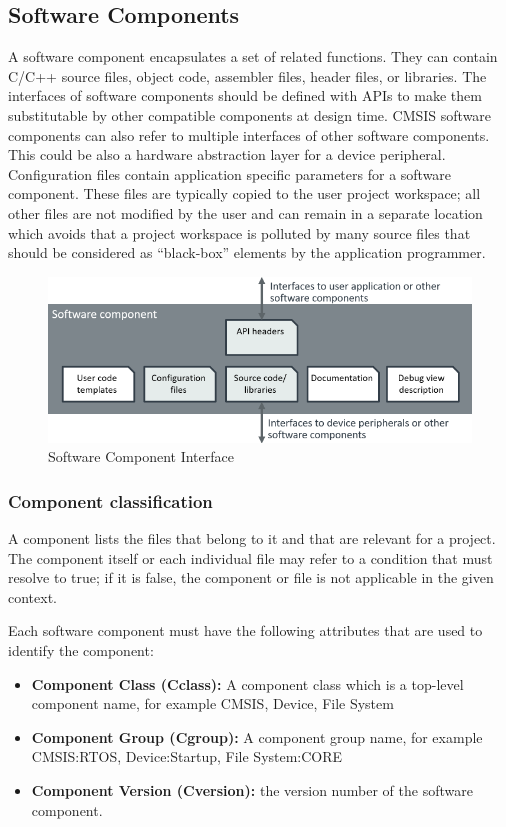 \subsection{Software Components}
A software component encapsulates a set of related functions. They can contain C/C++ source files, object code, assembler files, header files, or libraries. The interfaces of software components should be defined with APIs to make them substitutable by other compatible components at design time.
CMSIS software components can also refer to multiple interfaces of other software components. This could be also a hardware abstraction layer for a device peripheral.
Configuration files contain application specific parameters for a software component. These files are typically copied to the user project workspace; all other files are not modified by the user and can remain in a separate location which avoids that a project workspace is polluted by many source files that should be considered as “black-box” elements by the application programmer.
\begin{figure}[H]
	\centering
	\includegraphics[width=15cm]{img/ST_Summer_Internship/software_component.png}
	\caption{Software Component Interface}
	\label{fig:sw_comp}
\end{figure}
\subsubsection{Component classification}
A component lists the files that belong to it and that are relevant for a project. The component itself or each individual file may refer to a condition that must resolve to true; if it is false, the component or file is not applicable in the given context.

Each software component must have the following attributes that are used to identify the component:
\begin{itemize}
	\item \textbf{Component Class (Cclass):} A component class which is a top-level component name, for example CMSIS, Device, File System
	\item \textbf{Component Group (Cgroup):} A component group name, for example CMSIS:RTOS, Device:Startup, File System:CORE
	\item \textbf{Component Version (Cversion):} the version number of the software component.
\end{itemize}



